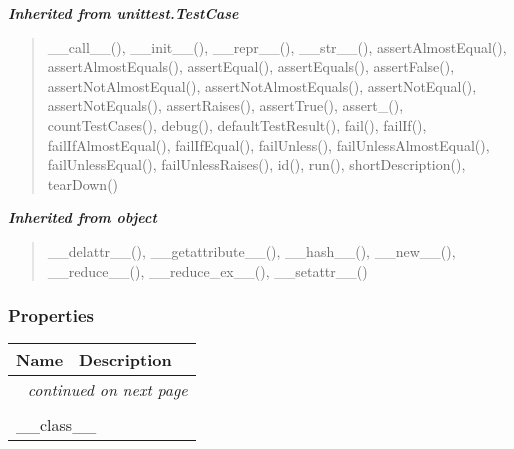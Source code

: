 \large{\textbf{\textit{Inherited from unittest.TestCase}}}

\begin{quote}
\_\_call\_\_(), \_\_init\_\_(), \_\_repr\_\_(), \_\_str\_\_(), assertAlmostEqual(), assertAlmostEquals(), assertEqual(), assertEquals(), assertFalse(), assertNotAlmostEqual(), assertNotAlmostEquals(), assertNotEqual(), assertNotEquals(), assertRaises(), assertTrue(), assert\_(), countTestCases(), debug(), defaultTestResult(), fail(), failIf(), failIfAlmostEqual(), failIfEqual(), failUnless(), failUnlessAlmostEqual(), failUnlessEqual(), failUnlessRaises(), id(), run(), shortDescription(), tearDown()
\end{quote}

\large{\textbf{\textit{Inherited from object}}}

\begin{quote}
\_\_delattr\_\_(), \_\_getattribute\_\_(), \_\_hash\_\_(), \_\_new\_\_(), \_\_reduce\_\_(), \_\_reduce\_ex\_\_(), \_\_setattr\_\_()
\end{quote}


  \subsubsection{Properties}

    \vspace{-1cm}
\hspace{\varindent}\begin{longtable}{|p{\varnamewidth}|p{\vardescrwidth}|l}
\cline{1-2}
\cline{1-2} \centering \textbf{Name} & \centering \textbf{Description}& \\
\cline{1-2}
\endhead\cline{1-2}\multicolumn{3}{r}{\small\textit{continued on next page}}\\\endfoot\cline{1-2}
\endlastfoot\multicolumn{2}{|l|}{\textit{Inherited from object}}\\
\multicolumn{2}{|p{\varwidth}|}{\raggedright \_\_class\_\_}\\
\cline{1-2}
\end{longtable}

